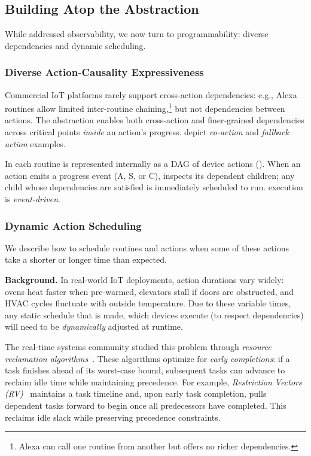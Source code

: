 \subsection{Building Atop the \abstraction{} Abstraction}
\label{rasc:sec:casestudies}
While  addressed observability, we now turn to programmability: diverse dependencies and dynamic scheduling.

\subsubsection{Diverse Action-Causality Expressiveness}
\label{rasc:sec:causality}


Commercial IoT platforms rarely support cross-action dependencies: e.g., Alexa routines allow limited inter-routine chaining,\footnote{Alexa can call one routine from another but offers no richer dependencies.} but not dependencies between actions. The \abs{} abstraction enables both cross-action and finer-grained dependencies across critical points {\it inside} an action's progress.
 depict {\it co-action} and \textit{fallback action} examples.

In \sysname{} each routine is represented internally as a DAG of device actions (). When an action emits a progress event (A, S, or C), \sysname{} inspects its dependent children; any child whose dependencies are satisfied is immediately scheduled to run. \sysname{} execution is {\it event-driven}. 

\subsubsection{Dynamic Action Scheduling}
\label{rasc:sec:dyn-sched}

We describe how to schedule routines and actions when some of these actions take a shorter or longer time than expected. 

\noindent\textbf{Background.}
In real-world IoT deployments, action durations vary widely:
ovens heat faster when pre-warmed, elevators stall if doors are obstructed,
and HVAC cycles fluctuate with outside temperature. 
Due to these variable times, any static schedule that is made, which devices execute (to respect dependencies) will need to be {\it dynamically} adjusted at runtime.

The real-time systems community studied this problem through
\emph{resource reclamation algorithms}~\cite{shen1993resource,manimaran1997new,gupta2000new}.
These algorithms optimize for \emph{early completions}:
if a task finishes ahead of its worst-case bound, subsequent tasks can advance to reclaim idle time while maintaining precedence.
For example, \emph{Restriction Vectors (RV)}~\cite{manimaran1997new}
maintains a task timeline and, upon early task completion, pulls dependent tasks forward to begin once all predecessors have completed. This reclaims idle slack while preserving precedence constraints.


